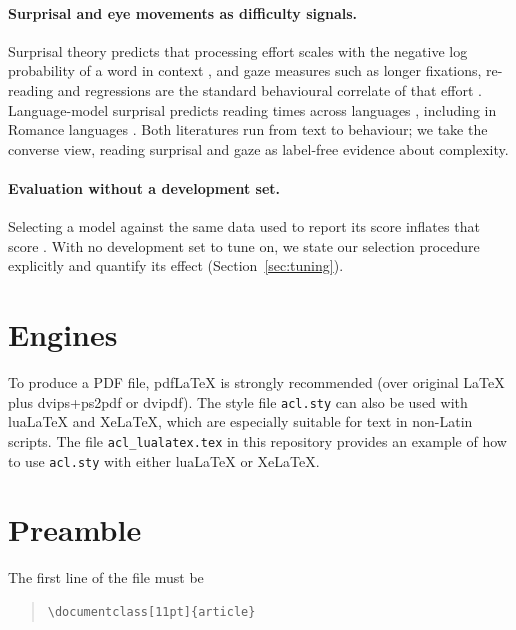 \paragraph{Surprisal and eye movements as difficulty signals.}
Surprisal theory predicts that processing effort scales with the
negative log probability of a word in context \citep{hale2001probabilistic},
and gaze measures such as longer fixations, re-reading and regressions
are the standard behavioural correlate of that effort
\citep{rayner1998eye}. Language-model surprisal predicts reading times
across languages \citep{hollenstein-etal-2021-multilingual}, including
in Romance languages \citep{alves-2025-benchmarking}. Both literatures
run from text to behaviour; we take the converse view, reading surprisal
and gaze as label-free evidence about complexity.

\paragraph{Evaluation without a development set.}
Selecting a model against the same data used to report its score inflates
that score \citep{gorman-bedrick-2019-need}. With no development set to
tune on, we state our selection procedure explicitly and quantify its
effect (Section~\ref{sec:tuning}).


\section{Engines}

To produce a PDF file, pdf\LaTeX{} is strongly recommended (over original \LaTeX{} plus dvips+ps2pdf or dvipdf).
The style file \texttt{acl.sty} can also be used with
lua\LaTeX{} and
Xe\LaTeX{}, which are especially suitable for text in non-Latin scripts.
The file \texttt{acl\_lualatex.tex} in this repository provides
an example of how to use \texttt{acl.sty} with either
lua\LaTeX{} or
Xe\LaTeX{}.

\section{Preamble}

The first line of the file must be
\begin{quote}
\begin{verbatim}
\documentclass[11pt]{article}
\end{verbatim}
\end{quote}

